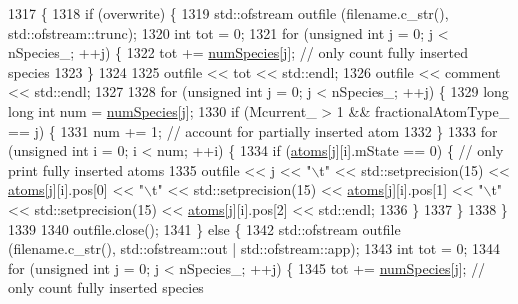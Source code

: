 \begin{DoxyCode}
1317                                                                                     \{
1318     \textcolor{keywordflow}{if} (overwrite) \{
1319         std::ofstream outfile (filename.c\_str(), std::ofstream::trunc);
1320         \textcolor{keywordtype}{int} tot = 0;
1321         \textcolor{keywordflow}{for} (\textcolor{keywordtype}{unsigned} \textcolor{keywordtype}{int} j = 0; j < nSpecies\_; ++j) \{
1322             tot += \hyperlink{classsim_system_a9eea865e6dc1cff377b1e79c4d9c23f0}{numSpecies}[j]; \textcolor{comment}{// only count fully inserted species}
1323         \}
1324 
1325         outfile << tot << std::endl;
1326         outfile << comment << std::endl;
1327 
1328         \textcolor{keywordflow}{for} (\textcolor{keywordtype}{unsigned} \textcolor{keywordtype}{int} j = 0; j < nSpecies\_; ++j) \{
1329             \textcolor{keywordtype}{long} \textcolor{keywordtype}{long} \textcolor{keywordtype}{int} num = \hyperlink{classsim_system_a9eea865e6dc1cff377b1e79c4d9c23f0}{numSpecies}[j];
1330             \textcolor{keywordflow}{if} (Mcurrent\_ > 1 && fractionalAtomType\_ == j) \{
1331                 num += 1; \textcolor{comment}{// account for partially inserted atom}
1332             \}
1333             \textcolor{keywordflow}{for} (\textcolor{keywordtype}{unsigned} \textcolor{keywordtype}{int} i = 0; i < num; ++i) \{
1334                 \textcolor{keywordflow}{if} (\hyperlink{classsim_system_a90421b19082f7fb8fc23b7264b1161e4}{atoms}[j][i].mState == 0) \{ \textcolor{comment}{// only print fully inserted atoms}
1335                     outfile << j << \textcolor{stringliteral}{"\(\backslash\)t"} <<  std::setprecision(15) << \hyperlink{classsim_system_a90421b19082f7fb8fc23b7264b1161e4}{atoms}[j][i].pos[0] << \textcolor{stringliteral}{"\(\backslash\)t"} << 
      std::setprecision(15) << \hyperlink{classsim_system_a90421b19082f7fb8fc23b7264b1161e4}{atoms}[j][i].pos[1] << \textcolor{stringliteral}{"\(\backslash\)t"} << std::setprecision(15) << 
      \hyperlink{classsim_system_a90421b19082f7fb8fc23b7264b1161e4}{atoms}[j][i].pos[2] << std::endl;
1336                 \}
1337             \}
1338         \}
1339 
1340         outfile.close();
1341     \} \textcolor{keywordflow}{else} \{
1342         std::ofstream outfile (filename.c\_str(), std::ofstream::out | std::ofstream::app);
1343         \textcolor{keywordtype}{int} tot = 0;
1344         \textcolor{keywordflow}{for} (\textcolor{keywordtype}{unsigned} \textcolor{keywordtype}{int} j = 0; j < nSpecies\_; ++j) \{
1345             tot += \hyperlink{classsim_system_a9eea865e6dc1cff377b1e79c4d9c23f0}{numSpecies}[j]; \textcolor{comment}{// only count fully inserted species}

\end{DoxyCode}
